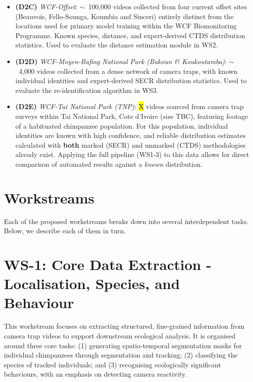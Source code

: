 \begin{itemize}
      \item \textbf{(D2C)} \textit{WCF-Offset}: $\sim$~100,000 videos collected from four current offset sites (Beauvois, Fello-Sounga, Koumbia and Sinceri) entirely distinct from the locations used for primary model training within the WCF Biomonitoring Programme. Known species, distance, and expert-derived CTDS distribution statistics. Used to evaluate the distance estimation module in WS2.
      \item \textbf{(D2D)} \textit{WCF-Moyen-Bafing National Park (Bakoun \& Koukoutamba)}: $\sim$~4,000 videos collected from a dense network of camera traps, with known individual identities and expert-derived SECR distribution statistics. Used to evaluate the re-identification algorithm in WS3.
      \item \textbf{(D2E)} \textit{WCF-Tai National Park (TNP)}: \hl{X} videos sourced from camera trap surveys within Tai National Park, Cote d'Ivoire (size TBC), featuring footage of a habituated chimpanzee population. For this population, individual identities are known with high confidence, and reliable distribution estimates calculated with \textbf{both} marked (SECR) and unmarked (CTDS) methodologies already exist. Applying the full pipeline (WS1-3) to this data allows for direct comparison of automated results against a \textit{known} distribution.
\end{itemize}

\section*{Workstreams}

Each of the proposed workstreams breaks down into several interdependent tasks. Below, we describe each of them in turn. %

\section*{WS-1: Core Data Extraction - Localisation, Species, and Behaviour}

This workstream focuses on extracting structured, fine-grained information from camera trap videos to support downstream ecological analysis. It is organised around three core tasks: (1) generating spatio-temporal segmentation masks for individual chimpanzees through segmentation and tracking; (2) classifying the species of tracked individuals; and (3) recognising ecologically significant behaviours, with an emphasis on detecting camera reactivity. %


